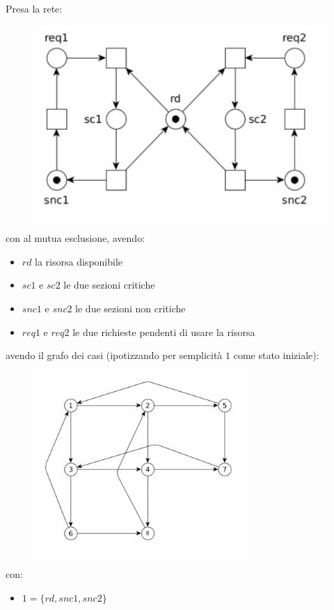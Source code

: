\begin{esempio}
  Presa la rete:
  \begin{figure}[H]
    \centering
    \includegraphics[scale = 0.5]{img/mc.jpg}
  \end{figure}
  con al mutua esclusione, avendo:
  \begin{itemize}
    \item $rd$ la risorsa disponibile
    \item $sc1$ e $sc2$ le due sezioni critiche
    \item $snc1$ e $snc2$ le due sezioni non critiche
    \item $req1$ e $req2$ le due richieste pendenti di usare la risorsa
  \end{itemize}
  avendo il grafo dei casi (ipotizzando per semplicità $1$ come stato iniziale):
  \begin{figure}[H]
    \centering
    \includegraphics[scale = 0.7]{img/mc2.jpg}
  \end{figure}
  con:
  \begin{itemize}
    \item $1=\{rd, snc1, snc2\}$

\end{itemize}
\end{esempio}
